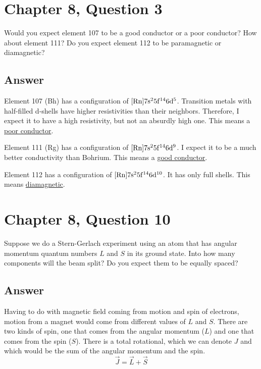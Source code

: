 \documentclass[12pt]{article}
\begin{document}
    \section{Chapter 8, Question 3}
        Would you expect element 107 to be a good conductor or a poor conductor? 
        How about element 111? 
        Do you expect element 112 to be paramagnetic or diamagnetic?

        \subsection{Answer}
            Element 107 (Bh) has a configuration of $\rm [Rn] 7s^2 5f^{14} 6d^5$.
            Transition metals with half-filled d-shells have higher resistivities than their neighbors.
            Therefore, I expect it to have a high resistivity, but not an absurdly high one. 
            This means a \underline{poor conductor}.

            Element 111 (Rg) has a configuration of $\rm [Rn] 7s^2 5f^{14} 6d^{9}$.
            I expect it to be a much better conductivity than Bohrium.
            This means a \underline{good conductor}.

            Element 112 has a configuration of $\rm [Rn] 7s^2 5f^{14} 6d^{10}$.
            It has only full shells.
            This means \underline{diamagnetic}.
    \pagebreak

    \section{Chapter 8, Question 10}
        Suppose we do a Stern-Gerlach experiment using an atom that has angular momentum quantum numbers $L$ and $S$ in its ground state. 
        Into how many components will the beam split? 
        Do you expect them to be equally spaced?

        \subsection{Answer}
            Having to do with magnetic field coming from motion and spin of electrons, motion from a magnet would come from different values of $L$ and $S$.
            There are two kinds of spin, one that comes from the angular momentum ($L$) and one that comes from the spin ($S$). 
            There is a total rotational, which we can denote $J$ and which would be the sum of the angular momentum and the spin.
            \begin{equation}
                \vec{J} = \vec{L} + \vec{S}
            \end{equation}
\end{document}
